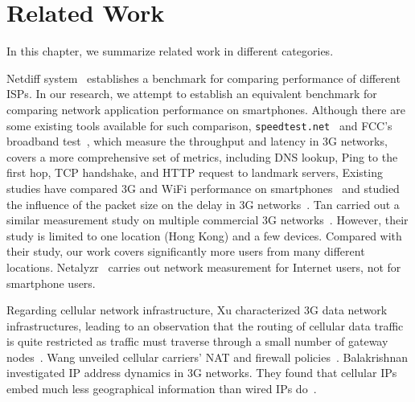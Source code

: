 \chapter{Related Work}
\label{chap:related}

In this chapter, we summarize related work in different categories.


Netdiff system~\cite{Mahajan:NSDI2008:NetDiff} establishes a benchmark for comparing performance of different ISPs. In our research, we attempt to establish an equivalent benchmark for comparing network application performance on smartphones. Although there are some existing tools available for such comparison, \eg \texttt{speedtest.net}~\cite{speedtestnet} and FCC's broadband test~\cite{fccspeedtest}, which measure the throughput and latency in 3G networks, \mobiperf covers a more comprehensive set of metrics, including DNS lookup, Ping to the first hop, TCP handshake, and HTTP request to landmark servers, \etc Existing studies have compared 3G and WiFi performance on smartphones~\cite{Gass:3GWiFi:PAM2010} and studied the influence of the packet size on the delay in 3G networks~\cite{Arlos:OneWay:PAM2010}. Tan \etal carried out a similar measurement study on multiple commercial 3G networks~\cite{wltan07}. However, their study is limited to one location (Hong Kong) and a few devices. Compared with their study, our work covers significantly more users from many different locations. Netalyzr~\cite{netalyzr} carries out network measurement for Internet users, not for smartphone users.

Regarding cellular network infrastructure, Xu \etal characterized 3G data network infrastructures, leading to an observation that the routing of cellular data traffic is quite restricted as traffic must traverse through a small number of gateway nodes~\cite{sigmetrics.cluster}. %
Wang \etal unveiled cellular carriers' NAT and firewall policies~\cite{sigcomm.nat}. %
Balakrishnan \etal investigated IP address dynamics in 3G networks. They found that cellular IPs embed much less geographical
information than wired IPs do~\cite{Mahesh:Ephemera:IMC09}. 


